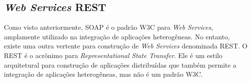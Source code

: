 \begin{comment}
Localizar particulares tipos de negócios e serviços eficientemente depende da nossa habilidade de qualificar as entradas de negócios e serviços no diretório, de acordo com um esquema de categorização ou taxonomia, usando informações como localização geográfica, tipo de indústria ou produto, para caracterizar o serviço.

Para identificar sistemas de taxonomia, cada sistema de classificação é registrado com um \textit{tModel} no registro UDDI. Informações taxonômicas são então codificadas em pares de nome-valor, qualificados por uma referência a uma chave de um \textit{tModel}, que identifica a qual taxonomia cada par pertence. Três taxonomias padrões são citadas pelo UDDI e pré-registradas no UBR:

\begin{itemize}
	\item uma classificação de indústria, obedecendo à taxonomia do \textit{North American Industry Classification System},NAICS (Sistema de Classificação Industrial Norte Americano)\nomenclature{NAICS}{\textit{North American Industry Classification System}};
  \item uma classificação de produtos e serviços obedecendo à taxonomia do \textit{Universal Standard Products and Services Code System} (USPSCS) (Padrão Universal de Sistema de Código de Produtos e Serviços)\nomenclature{USPSCS}{\textit{Universal Standard Products and Services Code System}}; e
  \item um sistema de categorização geográfica obedecendo à taxonomia do \textit{International Organization for Standardization Geographic} (ISO 3166\footnote{Um padrão de identificação de países, que possui tanto códigos alfabéticos no formato de 2 e 3 letras, quanto códigos numéricos de 3 dígitos. Os códigos para o Brasil, por exemplo, podem ser BR, BRA ou 076.}).\nomenclature{ISO}{\textit{International Organization for Standardization}}
\end{itemize}

Usando categorização, podemos pesquisar no diretório UDDI por tipos de serviços específicos. Um vez encontrado o serviço, podemos obter sua descrição WSDL para saber como utilizá-lo.
\end{comment}

\subsection{\textit{Web Services} REST}

Como visto anteriormente, SOAP é o padrão W3C para \textit{Web Services}, amplamente utilizado
na integração de aplicações heterogêneas. No entanto, existe uma outra vertente para construção de \textit{Web Services}
denominada REST. O REST é o acrônimo para \textit{Representational State Transfer}. 
Ele é um estilo arquitetural para construção de aplicações distribuídas que também permite a integração de aplicações heterogêneas,
mas não é um padrão W3C.

